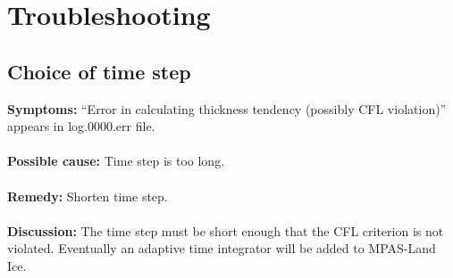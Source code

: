 \chapter{Troubleshooting}
\label{chap:troubleshooting}

\section{Choice of time step}

{\bf Symptoms:} ``Error in calculating thickness tendency (possibly CFL violation)'' appears in log.0000.err file.
\\ \\
{\bf Possible cause:} Time step is too long.
\\ \\
{\bf Remedy:}  Shorten time step.  
\\ \\
{\bf Discussion:}  The time step must be short enough that the CFL criterion is not violated.  Eventually an adaptive time integrator will be added to MPAS-Land Ice.


